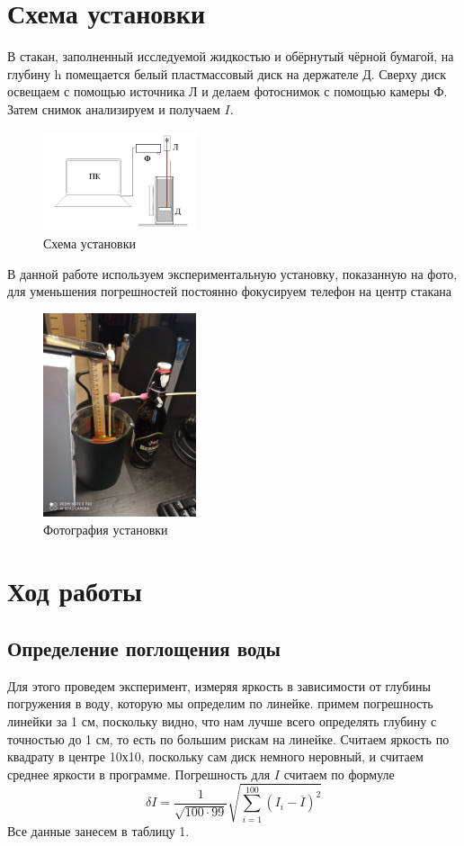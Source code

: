 \documentclass[a4paper, 12pt]{article}%
\begin{document}
\section*{Схема установки}
В стакан, заполненный исследуемой жидкостью и обёрнутый чёрной бумагой, на глубину h помещается белый пластмассовый диск на держателе Д. Сверху диск освещаем с помощью источника Л и делаем фотоснимок с помощью камеры Ф. Затем снимок анализируем и получаем $I$. 
\begin{figure}[h]
\begin{center}
\includegraphics[width = 0.4\textwidth]{4.png}
\caption{Схема установки}
\end{center}
\end{figure}
В данной работе используем экспериментальную установку, показанную на фото, для уменьшения погрешностей постоянно фокусируем телефон на центр стакана
\begin{figure}[h]
\begin{center}
\includegraphics[width = 0.4\textwidth]{3.jpg}
\caption{Фотография установки}
\end{center}
\end{figure}
\section*{Ход работы}
\subsection*{Определение поглощения воды}
Для этого проведем эксперимент, измеряя яркость в зависимости от глубины погружения в воду, которую мы определим по линейке. примем погрешность линейки за 1 см, поскольку видно, что нам лучше всего определять глубину с точностью до 1 см, то есть по большим рискам на линейке. Считаем яркость по квадрату в центре 10х10, поскольку сам диск немного неровный, и считаем среднее яркости в программе. Погрешность для $I$ считаем по формуле
\[\delta I = \frac{1}{\sqrt{100\cdot99}}\sqrt{\sum\limits_{i = 1}^{100} \left(I_i - \overline{I}\right)^2}\]
Все данные занесем в таблицу 1.
\end{document}
